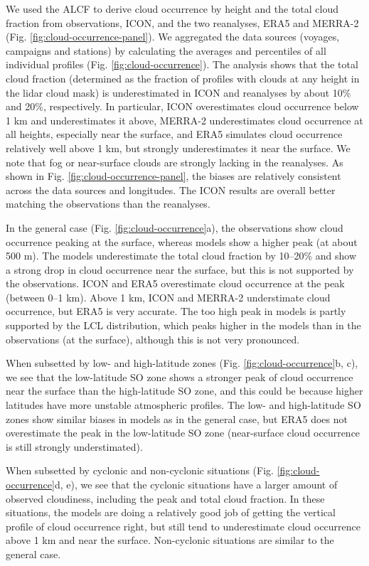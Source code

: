 \documentclass[12pt,a4paper]{article}
\begin{document}
We used the ALCF to derive cloud occurrence by height and the total cloud
fraction from observations, ICON, and the two reanalyses, ERA5 and MERRA-2
(Fig.  \ref{fig:cloud-occurrence-panel}). We aggregated the data sources
(voyages, campaigns and stations) by calculating the averages and percentiles
of all individual profiles (Fig.  \ref{fig:cloud-occurrence}). The analysis
shows that the total cloud fraction (determined as the fraction of profiles
with clouds at any height in the lidar cloud mask) is underestimated in ICON
and reanalyses by about 10\% and 20\%, respectively. In particular, ICON
overestimates cloud occurrence below 1 km and underestimates it above, MERRA-2
underestimates cloud occurrence at all heights, especially near the surface,
and ERA5 simulates cloud occurrence relatively well above 1 km, but strongly
underestimates it near the surface.  We note that fog or near-surface clouds
are strongly lacking in the reanalyses.  As shown in Fig.
\ref{fig:cloud-occurrence-panel}, the biases are relatively consistent across
the data sources and longitudes. The ICON results are overall better matching
the observations than the reanalyses.

In the general case (Fig. \ref{fig:cloud-occurrence}a), the observations show
cloud occurrence peaking at the surface, whereas models show a higher peak (at
about 500 m). The models underestimate the total cloud fraction by 10--20\% and
show a strong drop in cloud occurrence near the surface, but this is not
supported by the observations. ICON and ERA5 overestimate cloud occurrence at
the peak (between 0--1 km). Above 1 km, ICON and MERRA-2 understimate cloud
occurrence, but ERA5 is very accurate. The too high peak in models is partly
supported by the LCL distribution, which peaks higher in the models than in the
observations (at the surface), although this is not very pronounced.

When subsetted by low- and high-latitude zones (Fig.
\ref{fig:cloud-occurrence}b, c), we see that the low-latitude SO zone shows
a stronger peak of cloud occurrence near the surface than the high-latitude SO
zone, and this could be because higher latitudes have more unstable atmospheric
profiles. The low- and high-latitude SO zones show similar biases in models as
in the general case, but ERA5 does not overestimate the peak in the
low-latitude SO zone (near-surface cloud occurrence is still strongly
understimated).

When subsetted by cyclonic and non-cyclonic situations (Fig.
\ref{fig:cloud-occurrence}d, e), we see that the cyclonic situations have a
larger amount of observed cloudiness, including the peak and total cloud
fraction. In these situations, the models are doing a relatively good job of
getting the vertical profile of cloud occurrence right, but still tend to
underestimate cloud occurrence above 1 km and near the surface. Non-cyclonic
situations are similar to the general case.
\end{document}
